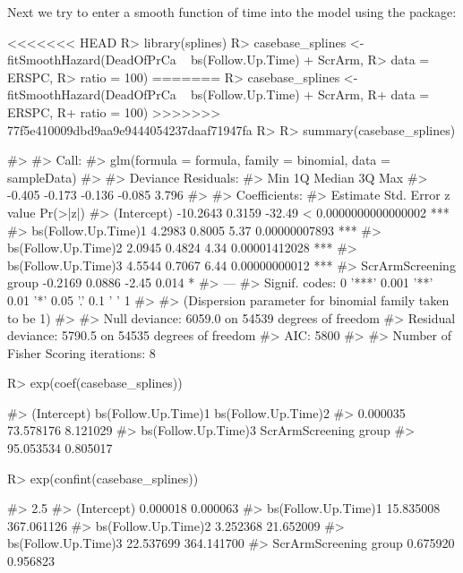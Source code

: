 \documentclass[
]{jss}
\begin{document}
Next we try to enter a smooth function of time into the model using the
 package:

\begin{CodeChunk}

\begin{CodeInput}
<<<<<<< HEAD
R> library(splines)
R> casebase_splines <- fitSmoothHazard(DeadOfPrCa ~ bs(Follow.Up.Time) + ScrArm,
R>                                     data = ERSPC, 
R>                                     ratio = 100)
=======
R> casebase_splines <- fitSmoothHazard(DeadOfPrCa ~ bs(Follow.Up.Time) + ScrArm, 
R+                                     data = ERSPC, 
R+                                     ratio = 100)
>>>>>>> 77f5e410009dbd9aa9e9444054237daaf71947fa
R> 
R> summary(casebase_splines)
\end{CodeInput}

\begin{CodeOutput}
#> 
#> Call:
#> glm(formula = formula, family = binomial, data = sampleData)
#> 
#> Deviance Residuals: 
#>    Min      1Q  Median      3Q     Max  
#> -0.405  -0.173  -0.136  -0.085   3.796  
#> 
#> Coefficients:
#>                       Estimate Std. Error z value             Pr(>|z|)    
#> (Intercept)           -10.2643     0.3159  -32.49 < 0.0000000000000002 ***
#> bs(Follow.Up.Time)1     4.2983     0.8005    5.37        0.00000007893 ***
#> bs(Follow.Up.Time)2     2.0945     0.4824    4.34        0.00001412028 ***
#> bs(Follow.Up.Time)3     4.5544     0.7067    6.44        0.00000000012 ***
#> ScrArmScreening group  -0.2169     0.0886   -2.45                0.014 *  
#> ---
#> Signif. codes:  0 '***' 0.001 '**' 0.01 '*' 0.05 '.' 0.1 ' ' 1
#> 
#> (Dispersion parameter for binomial family taken to be 1)
#> 
#>     Null deviance: 6059.0  on 54539  degrees of freedom
#> Residual deviance: 5790.5  on 54535  degrees of freedom
#> AIC: 5800
#> 
#> Number of Fisher Scoring iterations: 8
\end{CodeOutput}

\begin{CodeInput}
R> exp(coef(casebase_splines))
\end{CodeInput}

\begin{CodeOutput}
#>           (Intercept)   bs(Follow.Up.Time)1   bs(Follow.Up.Time)2 
#>              0.000035             73.578176              8.121029 
#>   bs(Follow.Up.Time)3 ScrArmScreening group 
#>             95.053534              0.805017
\end{CodeOutput}

\begin{CodeInput}
R> exp(confint(casebase_splines))
\end{CodeInput}

\begin{CodeOutput}
#>                           2.5 %
#> (Intercept)            0.000018   0.000063
#> bs(Follow.Up.Time)1   15.835008 367.061126
#> bs(Follow.Up.Time)2    3.252368  21.652009
#> bs(Follow.Up.Time)3   22.537699 364.141700
#> ScrArmScreening group  0.675920   0.956823
\end{CodeOutput}
\end{CodeChunk}
\end{document}
